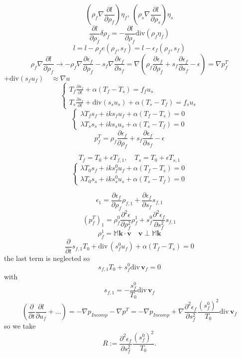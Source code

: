 \documentclass[12pt]{article}
\numberwithin{theorem}{section}
\def\div{\mbox{div}\,}
\begin{document}
\[\left(\rho_f \nabla \frac{\partial l}{\partial \rho_f}\right) \eta_f,\ 
\left(\rho_s \nabla \frac{\partial l}{\partial \rho_s}\right) \eta_s\]
\[\frac{\partial l}{\partial \rho_f} \delta \rho_f = -\frac{\partial l}{\partial \rho_f}\mathrm{div}(\rho_f \eta_f)\]
\[l=l-\rho_fe(\rho_f, s_f)=l-\epsilon_f(\rho_f, s_f)\]
\[\rho_f\nabla\frac{\partial l}{\partial \rho_f} \rightarrow -\rho_f\nabla\frac{\partial \epsilon_f}{\partial \rho_f}-s_f\nabla\frac{\partial \epsilon_f}{\partial s_f}=\nabla(\rho_f\frac{\partial \epsilon_f}{\partial \rho_f}+s_f\frac{\partial \epsilon_f}{\partial s_f}-\epsilon)=\nabla p_f^T\]
$+\mathrm{div} (s_f u_f)\quad \approx \nabla u$
\[\left\{ \begin{array}{l}
T_f\frac{\partial s_f}{\partial t} + \alpha(T_f - T_s) = f_fu_s \\
T_s\frac{\partial s_f}{\partial t} + \mathrm{div}(s_su_s) + \alpha(T_s-T_f) = f_su_s
\end{array}\right.\]
\[\left\{ \begin{array}{l}
\lambda T_f s_f + iks_fu_f + \alpha(T_f-T_s)=0 \\
\lambda T_s s_s + iks_su_s + \alpha(T_s-T_f)=0
\end{array}\right.\]
\[p^T_f = \rho_f\frac{\partial \epsilon_f}{\partial \rho_f}+s_f\frac{\partial \epsilon_f}{\partial s_f}-\epsilon \]

\[T_f = T_0 + \epsilon T_{f,1},\quad
T_s = T_0 + \epsilon T_{s,1}\]
\[\left\{ \begin{array}{l}
\lambda T_0s_f + iks^0_fu_f + \alpha(T_f-T_s) =0 \\
\lambda T_0s_s + iks^0_su_s + \alpha(T_s-T_f) =0
\end{array}\right.\]

\[\epsilon_1 = \frac{\partial \epsilon_f}{\partial \rho_f} \rho_{f,1} + \frac{\partial \epsilon_f}{\partial s_f} s_{f,1} \]
\[(p^T_f)_1=\rho^0_f \frac{\partial^2 \epsilon}{\partial \rho^2_f}\rho_f^1+s_f^0 \frac{\partial^2 \epsilon_f}{\partial s^2_f}s_{f,1}\]
\[\rho_f^1 = \mathbb{M}\mathbf{k}\cdot\mathbf{v}\quad \mathbf{v} \perp  \mathbb{M}\mathbf{k}\]
\[\frac\partial{\partial t}s_{f,1}T_0 + \div(s_f^0u_f)+\alpha(T_f-T_s)  = 0\]
the last term is neglected so
\[s_{f,1}T_0 + s_f^0\div{\mathbf{v}_f} =0\] with
\[s_{f,1}=-\frac{s_f^0}{T_0} \div\mathbf{v}_f\]
\[\left(\frac\partial{\partial t} \frac{\partial l}{\partial u_f} + \ldots\right) = -\nabla p_{Incomp}-\nabla p^T=-\nabla p_{Incomp}+\nabla\frac{\partial^2 \epsilon_f}{\partial s_f^2}\frac{(s^0_f)^2}{T_0}\div\mathbf{v}_f\]
so we take \[R := \frac{\partial^2 \epsilon_f}{\partial s_f^2}\frac{(s^0_f)^2}{T_0}.\]
\end{document}
